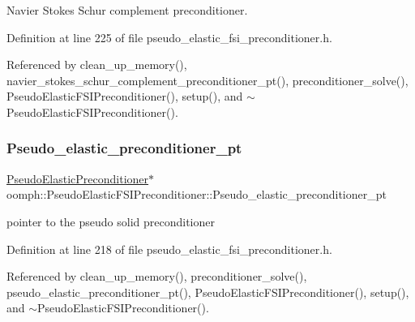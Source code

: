 Navier Stokes Schur complement preconditioner. 



Definition at line 225 of file pseudo\+\_\+elastic\+\_\+fsi\+\_\+preconditioner.\+h.



Referenced by clean\+\_\+up\+\_\+memory(), navier\+\_\+stokes\+\_\+schur\+\_\+complement\+\_\+preconditioner\+\_\+pt(), preconditioner\+\_\+solve(), Pseudo\+Elastic\+F\+S\+I\+Preconditioner(), setup(), and $\sim$\+Pseudo\+Elastic\+F\+S\+I\+Preconditioner().

\mbox{\label{classoomph_1_1PseudoElasticFSIPreconditioner_afad4b204e6b7b2a63e4c4e0fe2f9f2c0}} 
\subsubsection{\texorpdfstring{Pseudo\+\_\+elastic\+\_\+preconditioner\+\_\+pt}{Pseudo\_elastic\_preconditioner\_pt}}
{\footnotesize\ttfamily \hyperlink{classoomph_1_1PseudoElasticPreconditioner}{Pseudo\+Elastic\+Preconditioner}$\ast$ oomph\+::\+Pseudo\+Elastic\+F\+S\+I\+Preconditioner\+::\+Pseudo\+\_\+elastic\+\_\+preconditioner\+\_\+pt\hspace{0.3cm}{\ttfamily [private]}}



pointer to the pseudo solid preconditioner 



Definition at line 218 of file pseudo\+\_\+elastic\+\_\+fsi\+\_\+preconditioner.\+h.



Referenced by clean\+\_\+up\+\_\+memory(), preconditioner\+\_\+solve(), pseudo\+\_\+elastic\+\_\+preconditioner\+\_\+pt(), Pseudo\+Elastic\+F\+S\+I\+Preconditioner(), setup(), and $\sim$\+Pseudo\+Elastic\+F\+S\+I\+Preconditioner().

\mbox{\label{classoomph_1_1PseudoElasticFSIPreconditioner_a8699afc5b64ec0c3db5c3cea5fd60c18}} 
